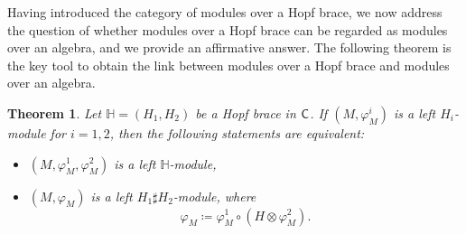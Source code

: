 \documentclass[11pt,reqno]{amsart}
\theoremstyle{plain}%
\newtheorem{theorem}{Theorem}[section]%
\theoremstyle{definition}
\theoremstyle{remark}
\begin{document}
Having introduced the category of modules over a Hopf brace, we now address the question of whether modules over a Hopf brace can be regarded as modules over an algebra, and we provide an affirmative answer. The following theorem is the key tool to obtain the link between modules over a Hopf brace and modules over an algebra.

\begin{theorem}\label{equivalenceth}
	Let $\mathbb{H}=(H_{1},H_{2})$ be a Hopf brace in ${\sf C}$. If $(M,\varphi_{M}^{i})$ is a left $H_{i}$-module for $i=1,2$, then the following statements are equivalent:
	\begin{itemize}
		\item[(i)] $(M,\varphi_{M}^{1},\varphi_{M}^{2})$ is a left $\mathbb{H}$-module,
		\item[(ii)] $(M,\varphi_{M})$ is a left $H_{1}\sharp H_{2}$-module, where 
		\[\varphi_{M}\coloneqq \varphi_{M}^{1}\circ(H\otimes\varphi_{M}^{2}).\] 
	\end{itemize}
\end{theorem}
\end{document}
